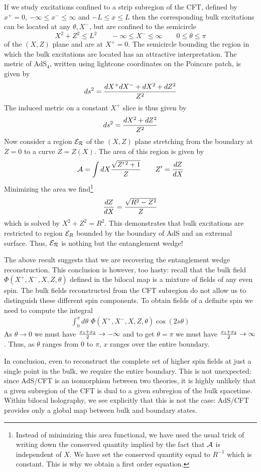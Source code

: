 \documentclass[a4paper,12pt]{article}
\def\bea{\begin{eqnarray}}
\def\eea{\end{eqnarray}}
\begin{document}
If we study excitations confined to a strip subregion of the CFT, defined by $x^+=0$, $-\infty \le x^-\le\infty$ and 
$-L\le x\le L$ then the corresponding bulk excitations can be located at any $\theta,X^-$, but are confined to the
semicircle
%
\begin{equation}
X^2+Z^2\le L^2\qquad -\infty\le X^-\le\infty\qquad 0\le\theta\le\pi
\end{equation}
%
of the $(X,Z)$ plane and are at $X^+=0$.
The semicircle bounding the region in which the bulk excitations are located has an attractive interpretation.
The metric of AdS$_4$, written using lightcone coordinates on the Poincare patch, is given by
%
\bea
ds^2 ={dX^+ dX^- +dX^2+dZ^2\over Z^2}
\eea
%
The induced metric on a constant $X^+$ slice is thus given by
%
\bea
ds^2={dX^2+dZ^2\over Z^2}
\eea
%
Now consider a region ${\cal E}_{\cal R}$ of the $(X,Z)$ plane stretching from the boundary at $Z=0$ to a curve $Z=Z(X)$.
The area of this region is given by
%
\bea
{\cal A} =\int dX {\sqrt{Z^{\prime\, 2}+1}\over Z}\qquad Z'={dZ\over dX}
\eea
%
Minimizing the area we find\footnote{Instead of minimizing this area functional, we have used the usual trick of writing
down the conserved quantity implied by the fact that ${\cal A}$ is independent of $X$. We have set the conserved
quantity equal to $R^{-1}$ which is constant. This is why we obtain a first order equation.}
%
\bea
{dZ\over dX}={\sqrt{R^2-Z^2}\over Z}
\eea
%
which is solved by $X^2+Z^2=R^2$.
This demonstrates that bulk excitations are restricted to region ${\cal E}_R$ bounded by the boundary of AdS and an 
extremal surface.
Thus, ${\cal E}_{\cal R}$ is nothing but the entanglement wedge!

The above result suggests that we are recovering the entanglement wedge reconstruction.
This conclusion is however, too hasty: recall that the bulk field $\Phi(X^+,X^-,X,Z,\theta)$ defined in the bilocal map
is a mixture of fields of any even spin.
The bulk fields reconstructed from the CFT subregion do not allow us to distinguish these different spin components.
To obtain fields of a definite spin we need to compute the integral
%
\bea
\int_0^\pi d\theta\,\, \Phi(X^+,X^-,X,Z,\theta)\cos (2s\theta)\label{sIntegral}
\eea
%
As $\theta\to 0$ we must have ${x_1+x_2\over 2}\to -\infty$ and to get $\theta=\pi$ we must have 
${x_1+x_2\over 2}\to \infty$.
Thus, as $\theta$ ranges from $0$ to $\pi$, $x$ ranges over the entire boundary.

In conclusion, even to reconstruct the complete set of higher spin fields at just a single point in the bulk, we require the 
entire boundary.
This is not unexpected: since AdS/CFT is an isomorphism between two theories, it is highly unlikely that a given subregion 
of the CFT is dual to a given subregion of the bulk spacetime.
Within bilocal holography, we see explicitly that this is not the case: AdS/CFT provides only a global map between bulk 
and boundary states.
\end{document}
